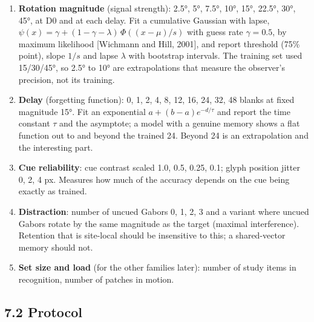 \documentclass[

]{article}
\providecommand{\tightlist}{%

  \setlength{\itemsep}{0pt}\setlength{\parskip}{0pt}}
\begin{document}
\begin{enumerate}

\def\labelenumi{\arabic{enumi}.}

\tightlist

\item

  \textbf{Rotation magnitude} (signal strength): 2.5°, 5°, 7.5°, 10°, 15°, 22.5°, 30°, 45°, at D0 and at each delay. Fit a cumulative Gaussian with lapse, \(\psi(x)=\gamma+(1-\gamma-\lambda)\,\Phi((x-\mu)/s)\) with guess rate \(\gamma=0.5\), by maximum likelihood {[}Wichmann and Hill, 2001{]}, and report threshold (75\% point), slope \(1/s\) and lapse \(\lambda\) with bootstrap intervals. The training set used 15/30/45°, so 2.5° to 10° are extrapolations that measure the observer's precision, not its training.

\item

  \textbf{Delay} (forgetting function): 0, 1, 2, 4, 8, 12, 16, 24, 32, 48 blanks at fixed magnitude 15°. Fit an exponential \(a+(b-a)e^{-d/\tau}\) and report the time constant \(\tau\) and the asymptote; a model with a genuine memory shows a flat function out to and beyond the trained 24. Beyond 24 is an extrapolation and the interesting part.

\item

  \textbf{Cue reliability}: cue contrast scaled 1.0, 0.5, 0.25, 0.1; glyph position jitter 0, 2, 4 px. Measures how much of the accuracy depends on the cue being exactly as trained.

\item

  \textbf{Distraction}: number of uncued Gabors 0, 1, 2, 3 and a variant where uncued Gabors rotate by the same magnitude as the target (maximal interference). Retention that is site-local should be insensitive to this; a shared-vector memory should not.

\item

  \textbf{Set size and load} (for the other families later): number of study items in recognition, number of patches in motion.

\end{enumerate}



\subsection{7.2 Protocol}\label{protocol}
\end{document}

